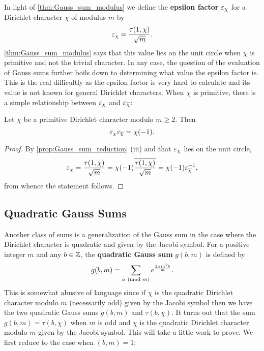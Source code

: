         In light of \cref{thm:Gauss_sum_modulus} we define the \textbf{epsilon factor} $\varepsilon_{\chi}$ for a Dirichlet character $\chi$ of modulus $m$ by
        \[
          \varepsilon_{\chi} = \frac{\tau(1,\chi)}{\sqrt{m}}.
        \]
        \cref{thm:Gauss_sum_modulus} says that this value lies on the unit circle when $\chi$ is primitive and not the trivial character. In any case, the question of the evaluation of Gauss sums further boils down to determining what value the epsilon factor is. This is the real difficultly as the epsilon factor is very hard to calculate and its value is not known for general Dirichlet characters. When $\chi$ is primitive, there is a simple relationship between $\varepsilon_{\chi}$ and $\varepsilon_{\overline{\chi}}$:

        \begin{proposition}\label{prop:epsilon_factor_relationship}
          Let $\chi$ be a primitive Dirichlet character modulo $m \ge 2$. Then
          \[
            \varepsilon_{\chi}\varepsilon_{\overline{\chi}} = \chi(-1).
          \]
        \end{proposition}
        \begin{proof}
          By \cref{prop:Gauss_sum_reduction} (iii) and that $\varepsilon_{\chi}$ lies on the unit circle,
          \[
            \varepsilon_{\chi} = \frac{\tau(1,\chi)}{\sqrt{m}} = \chi(-1)\overline{\frac{\tau(1,\chi)}{\sqrt{m}}} = \chi(-1)\varepsilon_{\overline{\chi}}^{-1},
          \]
          from whence the statement follows.
        \end{proof}
      \subsection*{Quadratic Gauss Sums}
        Another class of sums is a generalization of the Gauss sum in the case where the Dirichlet character is quadratic and given by the Jacobi symbol. For a positive integer $m$ and any $b \in \mathbb{Z}$, the \textbf{quadratic Gauss sum} $g(b,m)$ is defined by
        \[
          g(b,m) = \sum_{a \ \left(\text{mod }m\right)}e^{\frac{2\pi ia^{2}b}{m}}.
        \]
        This is somewhat abusive of language since if $\chi$ is the quadratic Dirichlet character modulo $m$ (necessarily odd) given by the Jacobi symbol then we have the two quadratic Gauss sums $g(b,m)$ and $\tau(b,\chi)$. It turns out that the sum $g(b,m) = \tau(b,\chi)$ when $m$ is odd and $\chi$ is the quadratic Dirichlet character modulo $m$ given by the Jacobi symbol. This will take a little work to prove. We first reduce to the case when $(b,m) = 1$:

